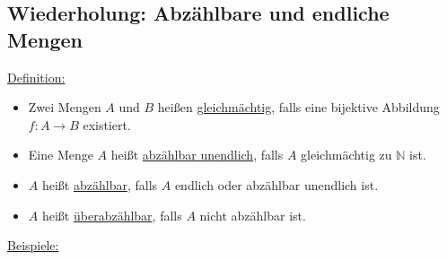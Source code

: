 \subsection{Wiederholung: Abzählbare und endliche Mengen}
\underline{Definition:}
\begin{itemize}[noitemsep]
	\item Zwei Mengen $A$ und $B$ heißen \underline{gleichmächtig}, falls eine bijektive Abbildung \mbox{$f: A\rightarrow B$} existiert.\\
	\item Eine Menge $A$ heißt \underline{abzählbar unendlich}, falls $A$ gleichmächtig zu $\mathbb{N}$ ist.\\
	\item $A$ heißt \underline{abzählbar}, falls $A$ endlich oder abzählbar unendlich ist.\\
	\item $A$ heißt \underline{überabzählbar}, falls $A$ nicht abzählbar ist.
\end{itemize}
\underline{Beispiele:}
